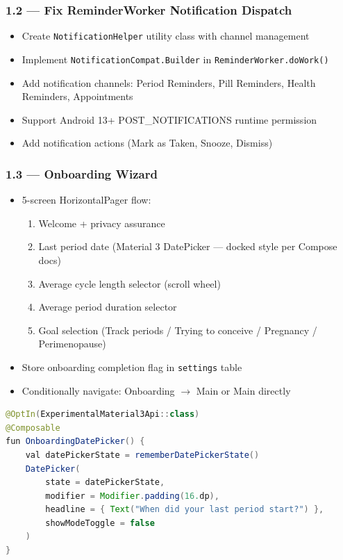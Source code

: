 \documentclass[12pt,a4paper]{article}
\begin{document}
\subsubsection{1.2 — Fix ReminderWorker Notification Dispatch}
\begin{itemize}[leftmargin=1.5em]
  \item Create \texttt{NotificationHelper} utility class with channel management
  \item Implement \texttt{NotificationCompat.Builder} in \texttt{ReminderWorker.doWork()}
  \item Add notification channels: Period Reminders, Pill Reminders, Health Reminders, Appointments
  \item Support Android 13+ POST\_NOTIFICATIONS runtime permission
  \item Add notification actions (Mark as Taken, Snooze, Dismiss)
\end{itemize}

\subsubsection{1.3 — Onboarding Wizard}
\begin{itemize}[leftmargin=1.5em]
  \item 5-screen HorizontalPager flow:
  \begin{enumerate}
    \item Welcome + privacy assurance
    \item Last period date (Material 3 DatePicker — docked style per Compose docs)
    \item Average cycle length selector (scroll wheel)
    \item Average period duration selector
    \item Goal selection (Track periods / Trying to conceive / Pregnancy / Perimenopause)
  \end{enumerate}
  \item Store onboarding completion flag in \texttt{settings} table
  \item Conditionally navigate: Onboarding $\rightarrow$ Main or Main directly
\end{itemize}

\begin{lstlisting}[language=Java, caption=Jetpack Compose DatePicker (from Context7 docs)]
@OptIn(ExperimentalMaterial3Api::class)
@Composable
fun OnboardingDatePicker() {
    val datePickerState = rememberDatePickerState()
    DatePicker(
        state = datePickerState,
        modifier = Modifier.padding(16.dp),
        headline = { Text("When did your last period start?") },
        showModeToggle = false
    )
}
\end{lstlisting}
\end{document}
